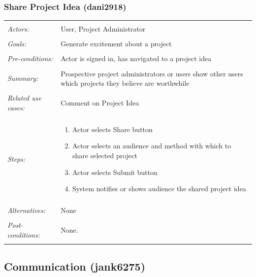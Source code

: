 \documentclass[11pt]{report}
\begin{document}
\subsubsection{Share Project Idea (dani2918)}
\begin{tabular}{ p{2cm} p{12cm} }
 \hline
 \\
 \textit{Actors:} & User, Project Administrator \\ 
 \\
 \textit{Goals:} & Generate excitement about a project  \\
 \\
 \textit{Pre-conditions:} & Actor is signed in, has navigated to a project idea  \\
 \\
 \textit{Summary:} &  Prospective project administrators or users show other users which projects they believe are worthwhile \\ 
 \\
 \textit{Related use cases:} & Comment on Project Idea \\ 
 \\
 \textit{Steps:} & \begin{enumerate}
  \item Actor selects Share button
  \item Actor selects an audience and method with which to share selected project
  \item Actor selects Submit button
  \item System notifies or shows audience the shared project idea
 \end{enumerate} \\
 \\
 \textit{Alternatives:} & None \\
 \\
 \textit{Post-conditions:} & None. \\
 \\
\hline
\end{tabular}



\subsection{Communication (jank6275)}
\end{document}
